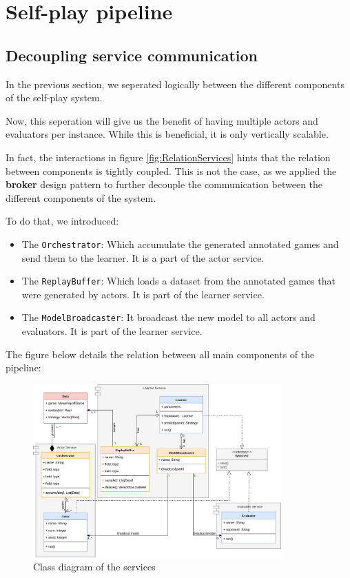 \section{Self-play pipeline}
\subsection{Decoupling service communication}
In the previous section, we seperated logically between the different components of the self-play system.

Now, this seperation will give us the benefit of having multiple actors and evaluators per instance. While this is beneficial, it is only vertically scalable.

In fact, the interactions in figure \ref{fig:RelationServices} hints that the relation between components is tightly coupled. This is not the case, as we applied the \textbf{broker} design pattern to further decouple the communication between the different components of the system.

To do that, we introduced:
\begin{itemize}
	\item The \texttt{Orchestrator}: Which accumulate the generated annotated games and send them to the learner. It is a part of the actor service.
	\item The \texttt{ReplayBuffer}: Which loads a dataset from the annotated games that were generated by actors. It is part of the learner service.
	\item The \texttt{ModelBroadcaster}: It broadcast the new model to all actors and evaluators. It is part of the learner service.
\end{itemize}
The figure below details the relation between all main components of the pipeline:

\begin{figure}[H]
	\centering
	\includegraphics[width=0.85\textwidth]{Figures/ServiceDiagram.png}
	\caption{Class diagram of the services}
\end{figure}
\FloatBarrier
